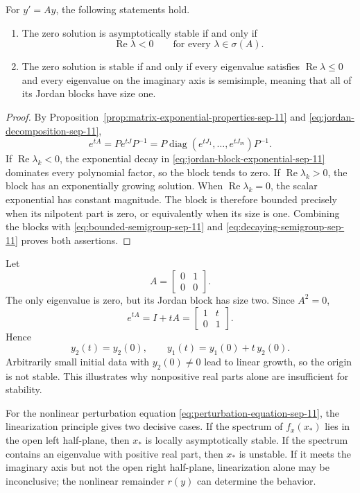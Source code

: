 \begin{theorem}
  For \(y'=Ay\), the following statements hold.
  \begin{enumerate}[label=\textup{(\roman*)}]
    \item The zero solution is asymptotically stable if and only if
      \[
        \operatorname{Re}\lambda<0
        \qquad\text{for every }\lambda\in\sigma(A).
      \]
    \item The zero solution is stable if and only if every eigenvalue
      satisfies \(\operatorname{Re}\lambda\leq0\) and every eigenvalue
      on the imaginary axis is semisimple, meaning that all of its
      Jordan blocks have size one.
  \end{enumerate}
\end{theorem}

\begin{proof}
  By Proposition~\ref{prop:matrix-exponential-properties-sep-11} and
  \eqref{eq:jordan-decomposition-sep-11},
  \[
    e^{tA}=Pe^{tJ}P^{-1}
    =P\operatorname{diag}(e^{tJ_1},\ldots,e^{tJ_m})P^{-1}.
  \]
  If \(\operatorname{Re}\lambda_k<0\), the exponential decay in
  \eqref{eq:jordan-block-exponential-sep-11} dominates every
  polynomial factor, so the block tends to zero. If
  \(\operatorname{Re}\lambda_k>0\), the block has an exponentially
  growing solution. When \(\operatorname{Re}\lambda_k=0\), the scalar
  exponential has constant magnitude. The block is therefore bounded
  precisely when its nilpotent part is zero, or equivalently when its
  size is one. Combining the blocks with
  \eqref{eq:bounded-semigroup-sep-11} and
  \eqref{eq:decaying-semigroup-sep-11} proves both assertions.
\end{proof}

\begin{example}
  Let
  \[
    A=\begin{bmatrix}0&1\\0&0\end{bmatrix}.
  \]
  The only eigenvalue is zero, but its Jordan block has size two. Since
  \(A^2=0\),
  \[
    e^{tA}=I+tA
    =\begin{bmatrix}1&t\\0&1\end{bmatrix}.
  \]
  Hence
  \[
    y_2(t)=y_2(0),
    \qquad
    y_1(t)=y_1(0)+t\,y_2(0).
  \]
  Arbitrarily small initial data with \(y_2(0)\neq0\) lead to linear
  growth, so the origin is not stable. This illustrates why
  nonpositive real parts alone are insufficient for stability.
\end{example}

\enlargethispage{2\baselineskip}
For the nonlinear perturbation equation
\eqref{eq:perturbation-equation-sep-11}, the linearization principle
gives two decisive cases. If the spectrum of \(f_x(x_*)\) lies in the
open left half-plane, then \(x_*\) is locally asymptotically stable. If
the spectrum contains an eigenvalue with positive real part, then
\(x_*\) is unstable. If it meets the imaginary axis but not the open
right half-plane, linearization alone may be inconclusive; the
nonlinear remainder \(r(y)\) can determine the behavior.
